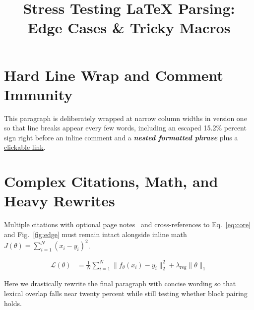 \documentclass{article}
\title{Stress Testing \textbf{LaTeX} Parsing: Edge Cases \& Tricky Macros}
\begin{document}
\section{Hard Line Wrap and Comment Immunity}
This paragraph is deliberately wrapped at narrow column widths in version one so that line breaks appear every few words, including an escaped 15.2\% percent sign right before an inline comment and a \textbf{\emph{nested formatted phrase}} plus a \href{https://example.org}{clickable link}.

\section{Complex Citations, Math, and Heavy Rewrites}
Multiple citations with optional page notes~\citep[see][p.~14]{alpha2023,beta2024} and cross-references to Eq.~\eqref{eq:core} and Fig.~\ref{fig:edge} must remain intact alongside inline math $J(\theta) = \sum_{i=1}^{N} (x_i - y_i)^2$.

\begin{align*}
\mathcal{L}(\theta) &= \frac{1}{N}\sum_{i=1}^N \|f_\theta(x_i) - y_i\|_2^2 + \lambda_{\text{reg}} \|\theta\|_1
\end{align*}

Here we drastically rewrite the final paragraph with concise wording so that lexical overlap falls near twenty percent while still testing whether block pairing holds.
\end{document}
